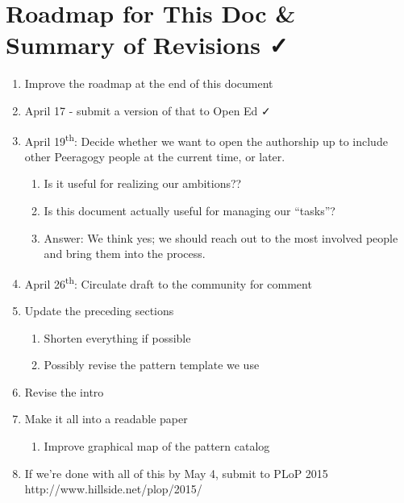 \section{Roadmap for This Doc \& Summary of Revisions ✓}

\begin{enumerate}
\item Improve the roadmap at the end of this document
\item April 17 - submit a version of that to Open Ed ✓
\item April 19\textsuperscript{th}: Decide whether we want to open the authorship up to include other Peeragogy people at the current time, or later. 
\begin{enumerate}
\item Is it useful for realizing our ambitions??
\item Is this document actually useful for managing our ``tasks''?
\item Answer: We think yes; we should reach out to the most involved people and bring them into the process.
\end{enumerate}
\item April 26\textsuperscript{th}: Circulate draft to the community for comment
\item Update the preceding sections
\begin{enumerate}
\item Shorten everything if possible
\item Possibly revise the pattern template we use
\end{enumerate}
\item Revise the intro
\item Make it all into a readable paper
\begin{enumerate}
\item Improve graphical map of the pattern catalog
\end{enumerate}
\item If we're done with all of this by May 4, submit to PLoP 2015 http://www.hillside.net/plop/2015/
\end{enumerate}